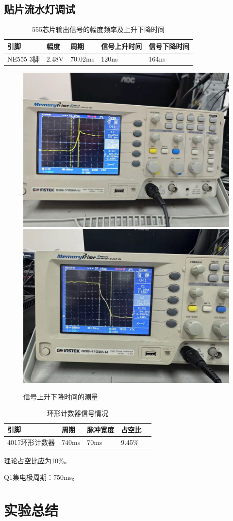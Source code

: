 \documentclass{zjureport}
\begin{document}
\subsection{贴片流水灯调试}
\begin{table}[H]
\centering
\caption{555芯片输出信号的幅度频率及上升下降时间}
\begin{tabular}{C{.15\textwidth}C{.15\textwidth}C{.15\textwidth}C{.15\textwidth}C{.2\textwidth}}
  \toprule
引脚       & 幅度    & 周期      & 信号上升时间 & 信号下降时间 \\
\midrule
NE555 3脚 & 2.48V & 70.02ms & 120ns  & 164ns\\
\bottomrule
\end{tabular}
\end{table}
\begin{figure}[H]
  \centering
  \includegraphics[width = .4\textwidth]{./figures/上升时间.jpg}
  \includegraphics[width = .4\textwidth]{./figures/下降时间.jpg}
  \caption{信号上升下降时间的测量}
\end{figure}
\begin{table}[H]
\centering
\caption{环形计数器信号情况}
\begin{tabular}{C{.2\textwidth}C{.15\textwidth}C{.15\textwidth}C{.15\textwidth}C{.2\textwidth}}
  \toprule
引脚        & 周期    & 脉冲宽度 & 占空比    \\
\midrule
4017环形计数器 & 740ms & 70ms & 9.45\% \\
\bottomrule
\end{tabular}
\end{table}
理论占空比应为10\%。

Q1集电极周期：750ms。
\section{实验总结}
\end{document}
